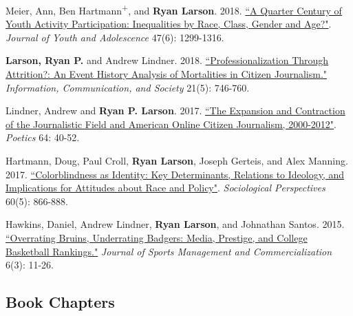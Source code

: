 \documentclass[letterpaper]{article}
\renewenvironment{itemize}{
  \begin{list}{}{
    \setlength{\leftmargin}{1.5em}
  }
}{
  \end{list}
}
\begin{document}
\begin{itemize}
\item Meier, Ann, Ben Hartmann\textsuperscript{+}, and \textbf{Ryan Larson}. 2018.  \href{https://ryanplarson.github.io/personal_site/pubs/meier_etal_18.pdf}{``A Quarter Century of Youth Activity Participation: Inequalities by Race, Class, Gender and Age?"}. \textit{Journal of Youth and Adolescence} 47(6): 1299-1316.

\item \textbf{Larson, Ryan P.} and Andrew Lindner. 2018. \href{https://ryanplarson.github.io/personal_site/pubs/larson_lindner_18.pdf}{``Professionalization Through Attrition?: An Event History Analysis of Mortalities in Citizen Journalism."}  \textit{Information, Communication, and Society} 21(5): 746-760.

\item Lindner, Andrew and \textbf{Ryan P. Larson}. 2017. \href{https://ryanplarson.github.io/personal_site/pubs/lindner_larson_17.pdf}{``The Expansion and Contraction of the Journalistic Field and American Online Citizen Journalism, 2000-2012"}. \textit{Poetics} 64: 40-52.

\item Hartmann, Doug, Paul Croll, \textbf{Ryan Larson}, Joseph Gerteis, and  Alex Manning. 2017. \href{https://ryanplarson.github.io/personal_site/pubs/hartmann_etal_17.pdf}{``Colorblindness as Identity:  Key Determinants, Relations to Ideology, and Implications for Attitudes about Race and Policy"}. \textit{Sociological Perspectives} 60(5): 866-888.

\item Hawkins, Daniel, Andrew Lindner, \textbf{Ryan Larson}, and Johnathan Santos. 2015. \href{https://ryanplarson.github.io/personal_site/pubs/hawkins_etal_15.pdf}{``Overrating Bruins, Underrating Badgers: Media, Prestige, and College Basketball Rankings."} \textit{Journal of Sports Management and Commercialization} 6(3): 11-26.

\end{itemize}

\subsection*{Book Chapters}
\end{document}
